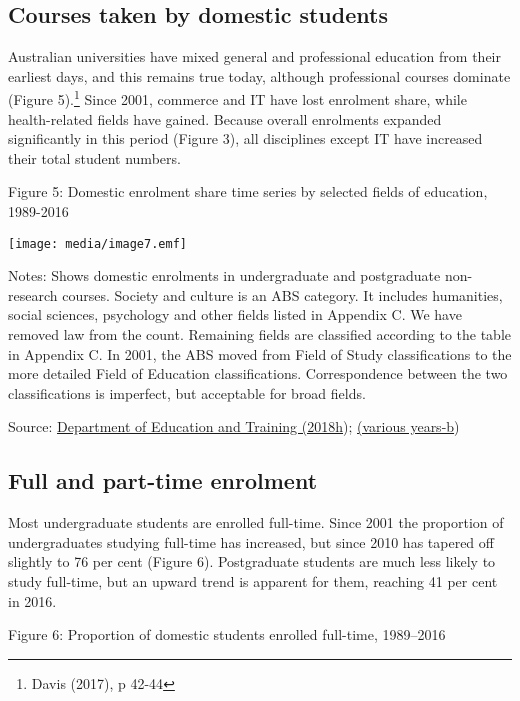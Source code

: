 \documentclass[]{book}
\begin{document}
\hypertarget{courses-taken-by-domestic-students}{%
\subsection{Courses taken by domestic students}\label{courses-taken-by-domestic-students}}

Australian universities have mixed general and professional education from their earliest days, and this remains true today, although professional courses dominate (Figure 5).\footnote{Davis (2017), p 42-44} Since 2001, commerce and IT have lost enrolment share, while health-related fields have gained. Because overall enrolments expanded significantly in this period (Figure 3), all disciplines except IT have increased their total student numbers.

\protect\hypertarget{_Ref521518905}{}{}Figure 5: Domestic enrolment share time series by selected fields of education, 1989-2016

\texttt{[image: media/image7.emf]}

Notes: Shows domestic enrolments in undergraduate and postgraduate non-research courses. Society and culture is an ABS category. It includes humanities, social sciences, psychology and other fields listed in Appendix C. We have removed law from the count. Remaining fields are classified according to the table in Appendix C. In 2001, the ABS moved from Field of Study classifications to the more detailed Field of Education classifications. Correspondence between the two classifications is imperfect, but acceptable for broad fields.

Source: \protect\hyperlink{_ENREF_87}{Department of Education and Training (2018h}); \protect\hyperlink{_ENREF_89}{(various years-b})

\hypertarget{full-and-part-time-enrolment}{%
\subsection{Full and part-time enrolment}\label{full-and-part-time-enrolment}}

Most undergraduate students are enrolled full-time. Since 2001 the proportion of undergraduates studying full-time has increased, but since 2010 has tapered off slightly to 76 per cent (Figure 6). Postgraduate students are much less likely to study full-time, but an upward trend is apparent for them, reaching 41 per cent in 2016.

\protect\hypertarget{_Ref519873107}{}{}Figure 6: Proportion of domestic students enrolled full-time, 1989--2016
\end{document}
